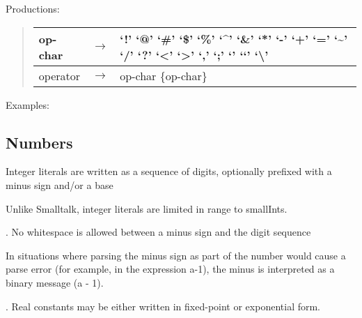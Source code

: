 \documentclass[letterpaper,10pt,english]{sphinxmanual}
\begin{document}
Productions:
\begin{quote}

\noindent\begin{tabulary}{\linewidth}{p{1.1cm} p{0.1cm} p{13.2cm}}
\hline

op-char
&
\(\rightarrow\)
&
‘!’ \textbar{} ‘@’ \textbar{} ‘\#’ \textbar{} ‘\$’ \textbar{} ‘\%’ \textbar{} ‘\textasciicircum{}’ \textbar{} ‘\&’ \textbar{} ‘*’ \textbar{} ‘-’ \textbar{} ‘+’ \textbar{} ‘=’ \textbar{} ‘\textasciitilde{}’ \textbar{} ‘/’ \textbar{} ‘?’ \textbar{} ‘\textless{}’ \textbar{} ‘\textgreater{}’ \textbar{} ‘,’ \textbar{} ‘;’ \textbar{} ‘\textbar{}’ \textbar{} ‘‘’ \textbar{} ‘\textbackslash{}’
\\
\hline
operator
&
\(\rightarrow\)
&
op-char \{op-char\}
\\
\hline\end{tabulary}

\end{quote}

Examples:
\begin{quote}

\begin{DUlineblock}{0em}
\item[] 
\end{DUlineblock}
\end{quote}


\subsection{Numbers}
\label{\detokenize{langref:index-65}}\label{\detokenize{langref:numbers}}
Integer literals are written as a sequence of digits, optionally prefixed with a minus sign and/or a
base %
\begin{footnote}[10]\sphinxAtStartFootnote
Unlike Smalltalk, integer literals are limited in range to smallInts.
%
\end{footnote}. No whitespace is allowed between a minus sign and the digit sequence %
\begin{footnote}[11]\sphinxAtStartFootnote
In situations where parsing the minus sign as part of the number would cause a parse error (for example, in the expression a-1), the minus is interpreted as a binary message (a - 1).
%
\end{footnote}. Real constants may
be either written in fixed-point or exponential form.
\end{document}

